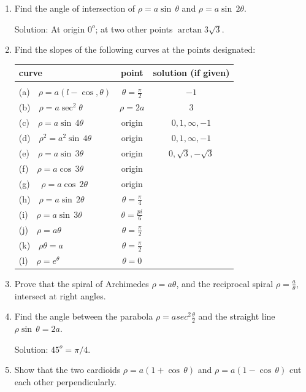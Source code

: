 \begin{enumerate}
\item
Find the angle of intersection of $\rho = a\sin\,\theta$ and 
$\rho = a\sin\, 2\theta$. 

Solution: At origin $0^o$; at two other points $\arctan 3 \sqrt{3}$.

\item
Find the slopes of the following curves at the points designated:

\begin{tabular}{lcc}
curve & point & solution (if given)\\ \hline
 & & \\
(a)\ \ $\rho = a(l - \cos,\theta)$ & $\theta = \frac{\pi}{2}$ & $-1$\\
(b)\ \  $\rho = a\sec^2 \theta$    & $\rho = 2a$              & $3$\\
(c)\ \ $\rho = a\sin\, 4\theta$    & origin                   &	$0, 1, \infty, -1$\\
(d)\ \ $\rho^2 = a^2\sin\, 4\theta$    & origin               &	$0, 1, \infty, -1$\\
(e)\ \ $\rho = a\sin\, 3\theta$    & origin                   & $0, \sqrt{3}, -\sqrt{3}$\\
(f)\ \ $\rho = a\cos\, 3\theta$    & 	origin & \\
(g) \ \ $\rho = a\cos\, 2\theta$    & origin & \\
(h)\ \ $\rho = a\sin\, 2\theta$    & $\theta = \frac{\pi}{4}$ & \\
(i)\ \ $\rho = a\sin\, 3\theta$    & $\theta = \frac{pi}{6}$ & \\
(j)\ \ $\rho = a\theta$           & $\theta = \frac{\pi}{2}$ & \\
(k)\ \ $\rho\theta = a$           & $\theta = \frac{\pi}{2}$ & \\
(l)\ \ $\rho = e^\theta$           & $\theta =  0$ & \\
\end{tabular}

\item
Prove that the spiral of Archimedes $\rho  = a\theta$, and the reciprocal 
spiral $\rho = \frac{a}{\theta}$, intersect at right angles.

\item
Find the angle between the parabola $\rho = a sec^2 \frac{\theta}{2}$ and 
the straight line $\rho\sin\, \theta = 2a$. 

Solution: $45^o = \pi/4$.

\item
Show that the two cardioids $\rho = a(1 + \cos\, \theta)$ and 
$\rho = a(1 - \cos\, \theta)$ cut each other perpendicularly.


\end{enumerate}
